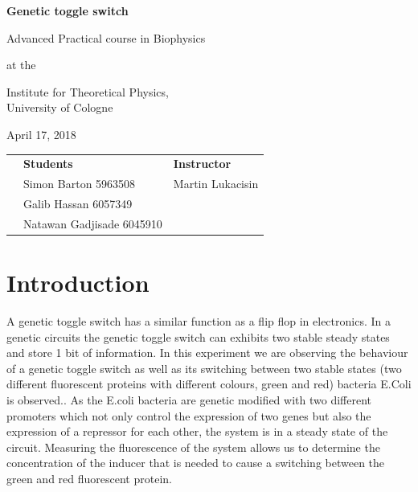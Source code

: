 \documentclass[english,11pt,a4paper]{article}
\begin{document}
\begin{titlepage}
	\centering
	\huge
	\textbf{Genetic toggle switch}
	
	\vspace{1cm}
	\huge
	Advanced Practical course in Biophysics
	
	\vspace{0.8cm}
	\normalsize
	at the
	
	\vspace{0.5cm}
	\Large
	Institute for Theoretical Physics, \\ University of Cologne
	
	\vspace{1cm}
	\normalsize
	April 17, 2018
	
	\vspace{1.5cm}
	\begin{figure}[h]
		\centering
	\end{figure}
	
	\vspace{2.5cm}
	\small
	
	\begin{centering}
		\begin{tabular}{lll}
			& \textbf{Students} & \hspace{5cm} \textbf{Instructor} \\
			& Simon Barton 5963508 & \hspace{5cm} Martin Lukacisin \\
			& Galib Hassan 6057349\\
			& Natawan Gadjisade 6045910
		\end{tabular}
	\end{centering}
	
\end{titlepage}

\tableofcontents

\pagebreak
{}

\section*{Introduction}

A genetic toggle switch has a similar function as a flip flop in electronics.
In a genetic circuits the genetic toggle switch can exhibits two stable steady states and store 1 bit of information.
In this experiment we are observing the behaviour of a genetic toggle switch as well as its switching between two stable states (two different fluorescent proteins with different colours, green and red) bacteria E.Coli is observed..
As the E.coli bacteria are genetic modified with two different promoters which not only control the expression of two genes but also the expression of a repressor for each other, the system is in a steady state of the circuit.   
Measuring the fluorescence of the system allows us  to determine the concentration of the inducer that is needed to cause a switching between the green and red fluorescent protein.
\end{document}
